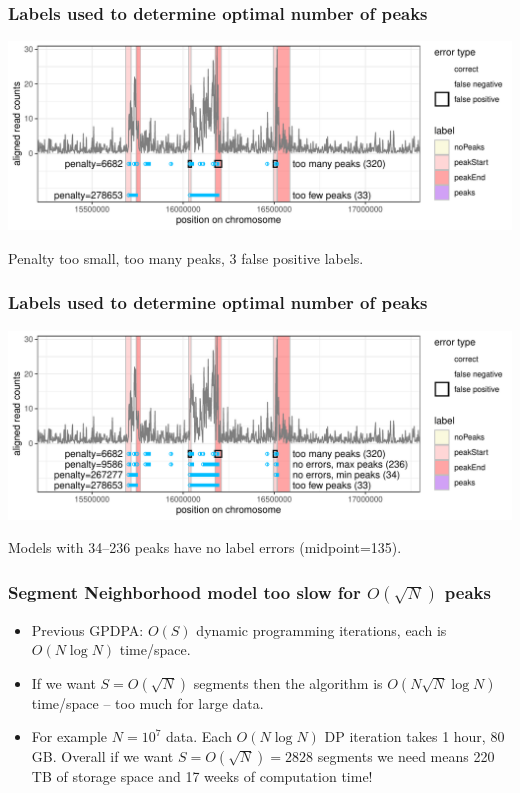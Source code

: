 \documentclass{beamer}
\begin{document}
\begin{frame}
  \frametitle{Labels used to determine optimal number of peaks}
  \includegraphics[width=\textwidth]{jss-figure-label-error-too-many}

  Penalty too small, too many peaks, 3 false positive labels.
\end{frame}

\begin{frame}
  \frametitle{Labels used to determine optimal number of peaks}
  \includegraphics[width=\textwidth]{jss-figure-label-error}
  
  Models with 34--236 peaks have no label errors (midpoint=135).
\end{frame}

\begin{frame}
  \frametitle{Segment Neighborhood model too slow for $O(\sqrt N)$ peaks }
  
  \vskip -0.4cm
  \begin{itemize} 
  \item %
    Previous GPDPA: $O(S)$ dynamic programming iterations,
    each is $O(N\log N)$ time/space.
  \item If we want $S=O(\sqrt{N})$ segments then the algorithm is
    $O(N \sqrt N \log N)$ time/space -- too much for large data.
  \item For example $N=10^7$ data. Each $O(N\log N)$ DP iteration
    takes 1 hour, 80 GB. Overall if we want $S=O(\sqrt N) = 2828$
    segments we need means 220 TB of storage space and 17 weeks of
    computation time!
  \end{itemize}
\end{frame}
\end{document}
